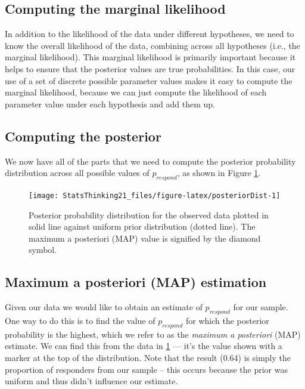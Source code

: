 \documentclass[12pt,]{book}
\theoremstyle{definition}
\theoremstyle{definition}
\theoremstyle{definition}
\theoremstyle{remark}
\begin{document}
\hypertarget{computing-the-marginal-likelihood-1}{%
\subsection{Computing the marginal likelihood}\label{computing-the-marginal-likelihood-1}}

In addition to the likelihood of the data under different hypotheses, we need to know the overall likelihood of the data, combining across all hypotheses (i.e., the marginal likelihood). This marginal likelihood is primarily important because it helps to ensure that the posterior values are true probabilities. In this case, our use of a set of discrete possible parameter values makes it easy to compute the marginal likelihood, because we can just compute the likelihood of each parameter value under each hypothesis and add them up.

\hypertarget{computing-the-posterior-1}{%
\subsection{Computing the posterior}\label{computing-the-posterior-1}}

We now have all of the parts that we need to compute the posterior probability distribution across all possible values of \(p_{respond}\), as shown in Figure \ref{fig:posteriorDist}.

\begin{figure}
\texttt{[image: StatsThinking21\_files/figure-latex/posteriorDist-1]} \caption{Posterior probability distribution for the observed data plotted in solid line against uniform prior distribution (dotted line). The maximum a posteriori (MAP) value is signified by the diamond symbol.}\label{fig:posteriorDist}
\end{figure}

\hypertarget{maximum-a-posteriori-map-estimation}{%
\subsection{Maximum a posteriori (MAP) estimation}\label{maximum-a-posteriori-map-estimation}}

Given our data we would like to obtain an estimate of \(p_{respond}\) for our sample. One way to do this is to find the value of \(p_{respond}\) for which the posterior probability is the highest, which we refer to as the \emph{maximum a posteriori} (MAP) estimate. We can find this from the data in \ref{fig:posteriorDist} --- it's the value shown with a marker at the top of the distribution. Note that the result (0.64) is simply the proportion of responders from our sample -- this occurs because the prior was uniform and thus didn't influence our estimate.
\end{document}
